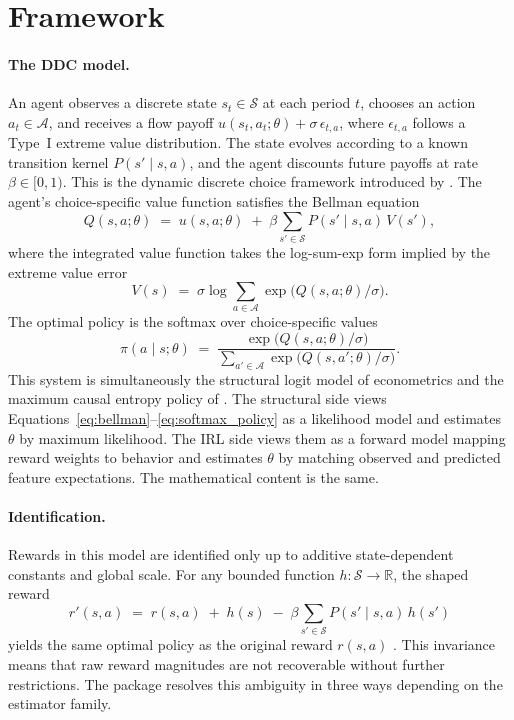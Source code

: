 \section{Framework}
\label{sec:framework}

\paragraph{The DDC model.}
An agent observes a discrete state $s_t \in \mathcal{S}$ at each period $t$, chooses an action $a_t \in \mathcal{A}$, and receives a flow payoff $u(s_t, a_t; \theta) + \sigma\,\epsilon_{t,a}$, where $\epsilon_{t,a}$ follows a Type~I extreme value distribution. The state evolves according to a known transition kernel $P(s' \mid s, a)$, and the agent discounts future payoffs at rate $\beta \in [0,1)$. This is the dynamic discrete choice framework introduced by \citet{rust1987}. The agent's choice-specific value function satisfies the Bellman equation
\begin{equation}
\label{eq:bellman}
Q(s,a;\theta) \;=\; u(s,a;\theta) \;+\; \beta \sum_{s' \in \mathcal{S}} P(s' \mid s,a)\, V(s'),
\end{equation}
where the integrated value function takes the log-sum-exp form implied by the extreme value error
\begin{equation}
\label{eq:smoothed_max}
V(s) \;=\; \sigma \log \sum_{a \in \mathcal{A}} \exp\!\bigl(Q(s,a;\theta)/\sigma\bigr).
\end{equation}
The optimal policy is the softmax over choice-specific values
\begin{equation}
\label{eq:softmax_policy}
\pi(a \mid s;\theta) \;=\; \frac{\exp\!\bigl(Q(s,a;\theta)/\sigma\bigr)}{\sum_{a' \in \mathcal{A}} \exp\!\bigl(Q(s,a';\theta)/\sigma\bigr)}.
\end{equation}
This system is simultaneously the structural logit model of econometrics and the maximum causal entropy policy of \citet{ziebart2010}. The structural side views Equations~\eqref{eq:bellman}--\eqref{eq:softmax_policy} as a likelihood model and estimates $\theta$ by maximum likelihood. The IRL side views them as a forward model mapping reward weights to behavior and estimates $\theta$ by matching observed and predicted feature expectations. The mathematical content is the same.

\paragraph{Identification.}
Rewards in this model are identified only up to additive state-dependent constants and global scale. For any bounded function $h \colon \mathcal{S} \to \mathbb{R}$, the shaped reward
\begin{equation}
\label{eq:reward_shaping}
r'(s,a) \;=\; r(s,a) \;+\; h(s) \;-\; \beta \sum_{s' \in \mathcal{S}} P(s' \mid s,a)\, h(s')
\end{equation}
yields the same optimal policy as the original reward $r(s,a)$ \citep{ng1999, magnacThesmar2002, kim2021}. This invariance means that raw reward magnitudes are not recoverable without further restrictions. The package resolves this ambiguity in three ways depending on the estimator family.

